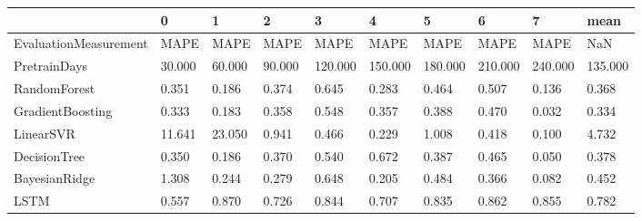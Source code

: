 \begin{tabular}{llllllllll}
\toprule
{} &      0 &      1 &      2 &       3 &       4 &       5 &       6 &       7 &    mean \\
\midrule
EvaluationMeasurement &   MAPE &   MAPE &   MAPE &    MAPE &    MAPE &    MAPE &    MAPE &    MAPE &     NaN \\
PretrainDays          & 30.000 & 60.000 & 90.000 & 120.000 & 150.000 & 180.000 & 210.000 & 240.000 & 135.000 \\
RandomForest          &  0.351 &  0.186 &  0.374 &   0.645 &   0.283 &   0.464 &   0.507 &   0.136 &   0.368 \\
GradientBoosting      &  0.333 &  0.183 &  0.358 &   0.548 &   0.357 &   0.388 &   0.470 &   0.032 &   0.334 \\
LinearSVR             & 11.641 & 23.050 &  0.941 &   0.466 &   0.229 &   1.008 &   0.418 &   0.100 &   4.732 \\
DecisionTree          &  0.350 &  0.186 &  0.370 &   0.540 &   0.672 &   0.387 &   0.465 &   0.050 &   0.378 \\
BayesianRidge         &  1.308 &  0.244 &  0.279 &   0.648 &   0.205 &   0.484 &   0.366 &   0.082 &   0.452 \\
LSTM                  &  0.557 &  0.870 &  0.726 &   0.844 &   0.707 &   0.835 &   0.862 &   0.855 &   0.782 \\
\bottomrule
\end{tabular}
